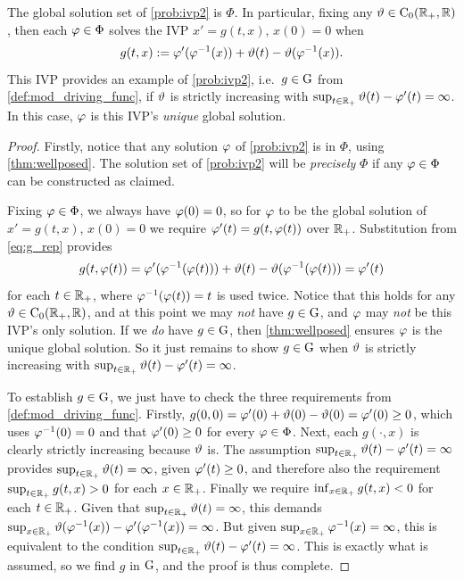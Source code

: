 \begin{theorem}\label{thm:solutionset}
    The global solution set of \autoref{prob:ivp2} is $\Phi$. In particular, fixing any $\vartheta\in\mathrm{C}_0(\mathbb{R}_+,\mathbb{R})$, then each $\varphi\in\Phi$ solves the IVP $x' = g(t,x)$, $x(0)=0$ when
    \begin{equation}\label{eq:g_rep}
        g(t,x):=\varphi'(\varphi^{-1}(x)) + \vartheta(t) - \vartheta(\varphi^{-1}(x)).
    \end{equation}
    This IVP provides an example of \autoref{prob:ivp2}, i.e.~$g\in\mathrm{G}$ from \autoref{def:mod_driving_func}, if $\vartheta$ is strictly increasing with $\sup_{t\in\mathbb{R}_+}\vartheta(t)-\varphi'(t)=\infty$. In this case, $\varphi$ is this IVP's \emph{unique} global solution.
\end{theorem}
\begin{proof}
    Firstly, notice that any solution $\varphi$ of \autoref{prob:ivp2} is in $\Phi$, using \autoref{thm:wellposed}. The solution set of \autoref{prob:ivp2} will be \emph{precisely} $\Phi$ if any $\varphi\in\Phi$ can be constructed as claimed.

    Fixing $\varphi\in\Phi$, we always have $\varphi(0)=0$, so for $\varphi$ to be the global solution of $x' = g(t,x)$, $x(0)=0$ we require $\varphi'(t)=g(t,\varphi(t))$ over $\mathbb{R}_+$. Substitution from \autoref{eq:g_rep} provides
    \begin{equation}
        g(t,\varphi(t)) =\varphi'(\varphi^{-1}(\varphi(t))) + \vartheta(t) - \vartheta(\varphi^{-1}(\varphi(t))) = \varphi'(t)
    \end{equation}
    for each $t\in\mathbb{R}_+$, where $\varphi^{-1}(\varphi(t))=t$ is used twice. Notice that this holds for any $\vartheta\in\mathrm{C}_0(\mathbb{R}_+,\mathbb{R})$, and at this point we may \emph{not} have $g\in\mathrm{G}$, and $\varphi$ may \emph{not} be this IVP's only solution. If we \emph{do} have $g\in\mathrm{G}$, then \autoref{thm:wellposed} ensures $\varphi$ is the unique global solution. So it just remains to show $g\in\mathrm{G}$ when $\vartheta$ is strictly increasing with $\sup_{t\in\mathbb{R}_+}\vartheta(t)-\varphi'(t)=\infty$.

    To establish $g\in\mathrm{G}$, we just have to check the three requirements from \autoref{def:mod_driving_func}. Firstly, $g(0,0)=\varphi'(0) + \vartheta(0)-\vartheta(0) =\varphi'(0)\ge0$, which uses $\varphi^{-1}(0)=0$ and that $\varphi'(0)\ge0$ for every $\varphi\in\Phi$. Next, each $g(\cdot,x)$ is clearly strictly increasing because $\vartheta$ is. The assumption $\sup_{t\in\mathbb{R}_+}\vartheta(t)-\varphi'(t)=\infty$ provides $\sup_{t\in\mathbb{R}_+}\vartheta(t)=\infty$, given $\varphi'(t)\ge0$, and therefore also the requirement $\sup_{t\in\mathbb{R}_+}g(t,x)>0$ for each $x\in\mathbb{R}_+$. Finally we require $\inf_{x\in\mathbb{R}_+}g(t,x)<0$ for each $t\in\mathbb{R}_+$. Given that $\sup_{t\in\mathbb{R}_+}\vartheta(t)=\infty$, this demands $\sup_{x\in\mathbb{R}_+}\vartheta(\varphi^{-1}(x)) - \varphi'(\varphi^{-1}(x))=\infty$. But given $\sup_{x\in\mathbb{R}_+}\varphi^{-1}(x)=\infty$, this is equivalent to the condition $\sup_{t\in\mathbb{R}_+}\vartheta(t) - \varphi'(t)=\infty$. This is exactly what is assumed, so we find $g$ in $\mathrm{G}$, and the proof is thus complete.
\end{proof}


